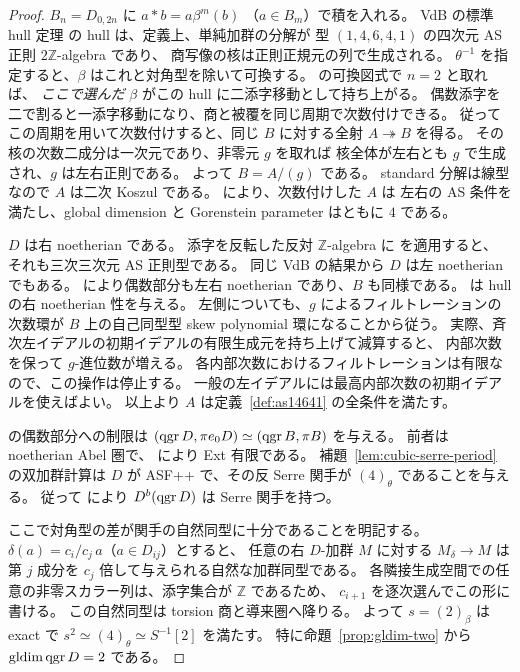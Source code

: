 \begin{proof}
$B_n=D_{0,2n}$ に $a*b=a\beta^m(b)$
（$a\in B_m$）で積を入れる。
VdB の標準 hull 定理\cite[arXiv v3, Theorem 6.1]{VdB2011} の hull は、定義上、単純加群の分解が
型 $(1,4,6,4,1)$ の四次元 AS 正則 $2\mathbb Z$-algebra であり、
商写像の核は正則正規元の列で生成される。
$\theta^{-1}$ を指定すると、$\beta$ はこれと対角型を除いて可換する。
\cite[arXiv v3, Lemmas 6.4--6.5]{VdB2011} の可換図式で $n=2$ と取れば、
\emph{ここで選んだ} $\beta$ がこの hull に二添字移動として持ち上がる。
偶数添字を二で割ると一添字移動になり、商と被覆を同じ周期で次数付けできる。
従ってこの周期を用いて次数付けすると、同じ $B$ に対する全射
$A\twoheadrightarrow B$ を得る。
その核の次数二成分は一次元であり、非零元 $g$ を取れば
核全体が左右とも $g$ で生成され、$g$ は左右正則である。
よって $B=A/(g)$ である。
standard 分解は線型なので $A$ は二次 Koszul である。
\cite[arXiv v1, Proposition 4.4 and Theorem 4.5]{MN2025} により、次数付けした $A$ は
左右の AS 条件を満たし、global dimension と Gorenstein parameter はともに $4$ である。

$D$ は右 noetherian である\cite[arXiv v3, Corollary 5.5.9]{VdB2011}。
添字を反転した反対 $\mathbb Z$-algebra に \cite[arXiv v1, Theorem 4.5]{MN2025} を適用すると、
それも三次三次元 AS 正則型である。
同じ VdB の結果から $D$ は左 noetherian でもある。
\cite[arXiv v3, Lemma 3.5]{VdB2011} により偶数部分も左右 noetherian であり、$B$ も同様である。
\cite[arXiv v3, Remark 6.2]{VdB2011} は hull の右 noetherian 性を与える。
左側についても、$g$ によるフィルトレーションの次数環が
$B$ 上の自己同型型 skew polynomial 環になることから従う。
実際、斉次左イデアルの初期イデアルの有限生成元を持ち上げて減算すると、
内部次数を保って $g$-進位数が増える。
各内部次数におけるフィルトレーションは有限なので、この操作は停止する。
一般の左イデアルには最高内部次数の初期イデアルを使えばよい。
以上より $A$ は定義~\ref{def:as14641} の全条件を満たす。

\cite[arXiv v3, Lemmas 3.4--3.5]{VdB2011} の偶数部分への制限は
$(\operatorname{qgr} D,\pi e_0D)\simeq(\operatorname{qgr} B,\pi B)$ を与える。
前者は noetherian Abel 圏で、\cite[arXiv v3, Corollary 5.5.9]{VdB2011} により Ext 有限である。
補題~\ref{lem:cubic-serre-period} の双加群計算は
$D$ が ASF++ で、その反 Serre 関手が $(4)_\theta$ であることを与える。
従って \cite[arXiv v1, Theorem 6.8]{MN2025} により $D^b(\operatorname{qgr} D)$ は Serre 関手を持つ。

ここで対角型の差が関手の自然同型に十分であることを明記する。
$\delta(a)=c_i/c_j\,a$（$a\in D_{ij}$）とすると、
任意の右 $D$-加群 $M$ に対する $M_\delta\to M$ は
第 $j$ 成分を $c_j$ 倍して与えられる自然な加群同型である。
各隣接生成空間での任意の非零スカラー列は、添字集合が $\mathbb Z$ であるため、
$c_{i+1}$ を逐次選んでこの形に書ける。
この自然同型は torsion 商と導来圏へ降りる。
よって $s=(2)_\beta$ は exact で
$s^2\simeq(4)_\theta\simeq S^{-1}[2]$ を満たす。
特に命題~\ref{prop:gldim-two} から $\operatorname{gldim}\operatorname{qgr} D=2$ である。


\end{proof}
